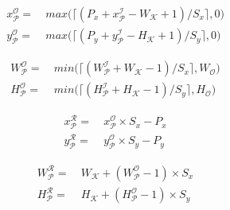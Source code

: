 \begin{align}
\label{eqn:xcoordinate}
x^\mathcal{O}_\mathcal{P} =&~ max\big(\lceil (P_x + x^\mathcal{I}_\mathcal{P} - W_\mathcal{K} + 1)/S_x \rceil, 0\big)\\
\label{eqn:ycoordinate}
y^\mathcal{O}_\mathcal{P} =&~ max\big(\lceil (P_y + y^\mathcal{I}_\mathcal{P} - H_\mathcal{K} + 1)/S_y \rceil, 0\big)
\end{align}

\begin{align}
\label{eqn:patchwidth}
W^\mathcal{O}_\mathcal{P} =&~ min\big(\lceil (W^\mathcal{I}_\mathcal{P} + W_\mathcal{K} - 1)/S_x \rceil, W_{\mathcal{O}}\big)\\
\label{eqn:patchheight}
H^\mathcal{O}_\mathcal{P} =&~ min\big(\lceil (H^\mathcal{I}_\mathcal{P} + H_\mathcal{K} - 1)/S_y \rceil, H_{\mathcal{O}}\big)
\end{align}

\begin{align}
\label{eqn:xreadcoordinate}
x^\mathcal{R}_\mathcal{P} =&~ x^\mathcal{O}_\mathcal{P} \times S_x - P_x\\
\label{eqn:yreadcoordinate}
y^\mathcal{R}_\mathcal{P} =&~ y^\mathcal{O}_\mathcal{P} \times S_y - P_y
\end{align}

\begin{align}
\label{eqn:readpatchwidth}
W^\mathcal{R}_\mathcal{P} =&~ W_\mathcal{K} + (W^\mathcal{O}_\mathcal{P}-1) \times S_x\\
\label{eqn:readpatchheight}
H^\mathcal{R}_\mathcal{P} =&~ H_\mathcal{K} + (H^\mathcal{O}_\mathcal{P}-1) \times S_y
\end{align}


